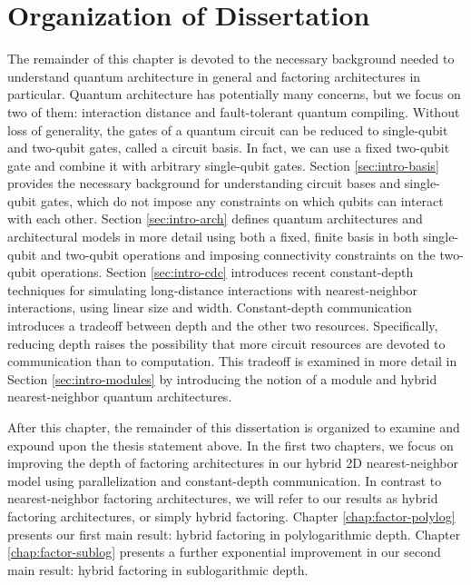 \section{Organization of Dissertation}
\label{sec:intro-org}

The remainder of this chapter is devoted to the necessary background needed
to understand quantum architecture in general and factoring architectures
in particular. Quantum architecture has potentially many concerns, but we
focus on two of them: interaction distance and fault-tolerant quantum compiling.
Without loss of generality, the gates of a quantum circuit can be reduced to
single-qubit and two-qubit gates, called a circuit basis.
In fact, we can use a fixed two-qubit gate
and combine it with arbitrary single-qubit gates.
Section \ref{sec:intro-basis} provides the necessary background for
understanding circuit bases and single-qubit gates,
which do not impose any constraints on
which qubits can interact with each other. Section \ref{sec:intro-arch}
defines quantum architectures and architectural models in more detail using
both a fixed, finite basis in both single-qubit and two-qubit operations
and imposing connectivity constraints on the two-qubit operations.
Section \ref{sec:intro-cdc} introduces recent constant-depth techniques
for simulating long-distance interactions with nearest-neighbor
interactions, using linear size and width. Constant-depth communication
introduces a tradeoff between depth and the other two resources. Specifically,
reducing depth raises the possibility that more circuit resources are
devoted to communication than to computation. This tradeoff is examined 
in more detail in Section \ref{sec:intro-modules}
by introducing the notion of a module and hybrid nearest-neighbor
quantum architectures.

After this chapter, the remainder of this dissertation is organized to
examine and expound upon the thesis statement above. In the first two
chapters, we focus on improving the depth of factoring architectures
in our hybrid 2D nearest-neighbor model using parallelization and
constant-depth communication. In contrast to nearest-neighbor factoring
architectures, we will refer to our results as hybrid factoring architectures,
or simply hybrid factoring.
Chapter \ref{chap:factor-polylog} presents our first main result:
hybrid factoring in polylogarithmic depth.
Chapter \ref{chap:factor-sublog} presents a further exponential improvement
in our second main result: hybrid factoring in sublogarithmic depth.

